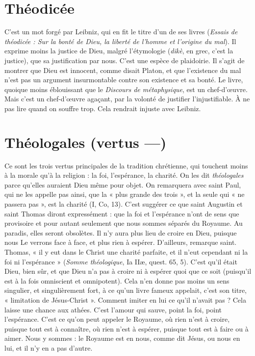 \section{Théodicée}
C’est un mot forgé par Leibniz, qui en fit le titre d’un de ses
livres ({\it Essais de théodicée : Sur la bonté de Dieu, la liberté de
l’homme et l'origine du mal}). Il exprime moins la justice de Dieu, malgré l’étymologie
({\it dikè}, en grec, c’est la justice), que sa justification par nous. C’est une
espèce de plaidoirie. Il s’agit de montrer que Dieu est innocent, comme disait
Platon, et que l'existence du mal n’est pas un argument insurmontable contre
son existence et sa bonté. Le livre, quoique moins éblouissant que le {\it Discours de
métaphysique}, est un chef-d'œuvre. Mais c’est un chef-d'œuvre agaçant, par la
volonté de justifier l’injustifiable. À ne pas lire quand on souffre trop. Cela rendrait
injuste avec Leibniz.

\section{Théologales (vertus —)}
Ce sont les trois vertus principales de la tradition
chrétienne, qui touchent moins à la
morale qu’à la religion : la foi, l'espérance, la charité. On les dit {\it théologales}
parce qu’elles auraient Dieu même pour objet. On remarquera avec saint Paul,
qui ne les appelle pas ainsi, que la « plus grande des trois », et la seule qui « ne
passera pas », est la charité (I, Co, 13). C’est suggérer ce que saint Augustin et
saint Thomas diront expressément : que la foi et l'espérance n’ont de sens que
provisoire et pour autant seulement que nous sommes séparés du Royaume. Au
paradis, elles seront obsolètes. Il n’y aura plus lieu de croire en Dieu, puisque
nous Le verrons face à face, et plus rien à espérer. D'ailleurs, remarque saint.
Thomas, « il y eut dans le Christ une charité parfaite, et il n’eut cependant ni
la foi ni l'espérance » ({\it Somme théologique}, Ia IIæ, quest. 65, 5). C’est qu’il était
Dieu, bien sûr, et que Dieu n’a pas à croire ni à espérer quoi que ce soit
(puisqu'il est à la fois omniscient et omnipotent). Cela n’en donne pas moins
un sens singulier, et singulièrement fort, à ce qu’un livre fameux appelait, c’est
son titre, « limitation de Jésus-Christ ». Comment imiter en lui ce qu’il n’avait
pas ? Cela laisse une chance aux athées. C’est l’amour qui sauve, point la foi,
point l'espérance. C’est ce qu’on peut appeler le Royaume, où rien n’est à
croire, puisque tout est à connaître, où rien n’est à espérer, puisque tout est à
faire ou à aimer. Nous y sommes : le Royaume est en nous, comme dit Jésus,
ou nous en lui, et il n’y en a pas d’autre.

